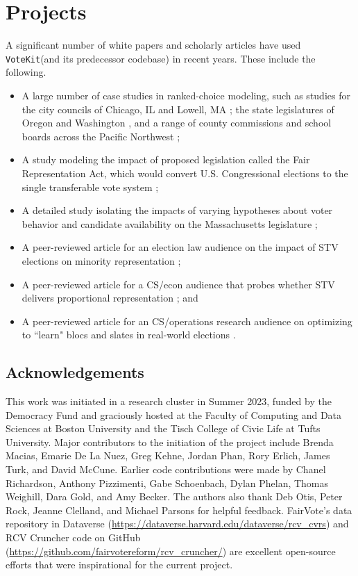 \documentclass{article}
\newcommand{\VK}{{\tt VoteKit}\xspace}
\begin{document}
\clearpage
\section{Projects}
A significant number of white papers and scholarly articles have used \VK (and its predecessor codebase) in recent years.
These include the following.
\begin{itemize}
    \item A large number of case studies in ranked-choice modeling, such as studies for the city councils of Chicago, IL \cite{chicago_city} and  Lowell, MA \cite{lowell_city}; the state legislatures of Oregon and Washington \cite{oregon_state,washington_leg}, and a range of county commissions and school boards across the Pacific Northwest \cite{tukwila_school,chelan_county};
    \item A study modeling the impact of proposed legislation called the Fair Representation Act, which would convert U.S. Congressional elections to the single transferable vote system \cite{FairVote};
    \item A detailed study isolating the impacts of varying hypotheses about voter behavior and candidate availability on the Massachusetts legislature \cite{massachusetts_leg};
    \item A peer-reviewed article for an election law audience on the impact of STV elections on minority representation \cite{Benade2021};
    \item A peer-reviewed article for a CS/econ audience that probes whether STV delivers proportional representation \cite{benade_donnay_duchin_weighill_24}; and
    \item A peer-reviewed article for an CS/operations research audience on optimizing to ``learn" blocs and slates in real-world elections \cite{duchin_tapp_24}.
\end{itemize}

\FloatBarrier

\subsection*{Acknowledgements}
This work was initiated in a research cluster in Summer 2023, funded by the Democracy Fund and graciously hosted at the Faculty of Computing and Data Sciences at Boston University and the Tisch College of Civic Life at Tufts University.  Major contributors to the initiation of the project include 
Brenda Macias, Emarie De La Nuez, Greg Kehne, Jordan Phan, Rory Erlich, 
James Turk, and  David McCune.  Earlier code contributions were made by Chanel Richardson, Anthony Pizzimenti, Gabe Schoenbach, Dylan Phelan, Thomas Weighill, Dara Gold, and Amy Becker.
The authors also thank 
Deb Otis, Peter Rock, Jeanne Clelland, and Michael Parsons for helpful feedback.  FairVote's data repository in Dataverse (\url{https://dataverse.harvard.edu/dataverse/rcv_cvrs}) and {\sf RCV Cruncher} code on GitHub (\url{https://github.com/fairvotereform/rcv_cruncher/}) are excellent open-source efforts that were inspirational for the current project.

\clearpage
\printbibliography
\end{document}
